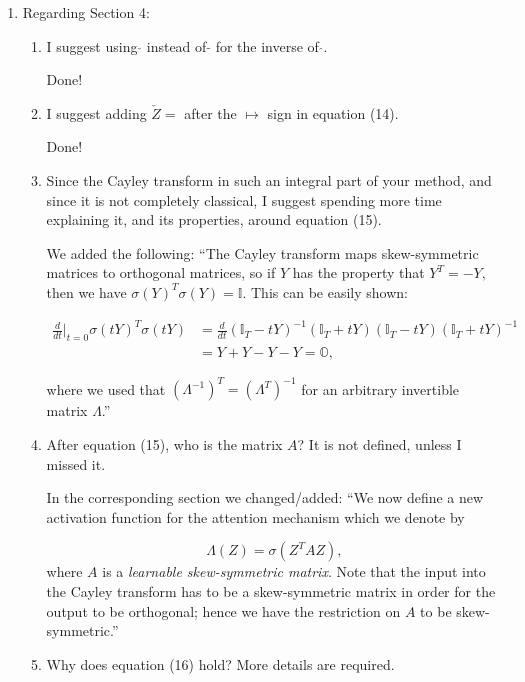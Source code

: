 \documentclass{article}
\begin{document}
\begin{enumerate}
\item Regarding Section 4:
\begin{enumerate}[label=\arabic*.]
\item I suggest using $\check{}$ instead of $\tilde{}$ for the inverse of $\hat{}$.

    {\color{mred} Done!}
\item I suggest adding $\check{Z} =$ after the $\mapsto$ sign in equation (14).

    {\color{mred} Done!}
\item Since the Cayley transform in such an integral part of your method, and since it is not completely classical, I suggest spending more time explaining it, and its properties, around equation (15).

    {\color{mred} We added the following: ``The Cayley transform maps skew-symmetric matrices to orthogonal matrices, so if $Y$ has the property that $Y^T = -Y,$ then we have $\sigma(Y)^T\sigma(Y) = \mathbb{I}.$ This can be easily shown:

    \begin{equation*}
    \begin{aligned}
    \frac{d}{dt}\Big|_{t=0}\sigma(tY)^T\sigma(tY) & = \frac{d}{dt}(\mathbb{I}_{T} - tY)^{-1}(\mathbb{I}_{T} + tY)(\mathbb{I}_{T} - tY)(\mathbb{I}_{T} + tY)^{-1} \\
                                                  & = Y + Y - Y - Y = \mathbb{O},
    \end{aligned}
    \end{equation*}
    
    where we used that $(\Lambda^{-1})^T = (\Lambda^T)^{-1}$ for an arbitrary invertible matrix $\Lambda$.''}
\item After equation (15), who is the matrix $A$? It is not defined, unless I missed it.

    {\color{mred} In the corresponding section we changed/added: ``We now define a new activation function for the attention mechanism which we denote by 

    \begin{equation*}
    \Lambda(Z) = \sigma (Z^T A Z),
    \end{equation*}    
    where $A$ is a \textit{learnable skew-symmetric matrix}. Note that the input into the Cayley transform has to be a skew-symmetric matrix in order for the output to be orthogonal; hence we have the restriction on $A$ to be skew-symmetric.''}

\item Why does equation (16) hold? More details are required.


\end{enumerate}
\end{enumerate}
\end{document}
